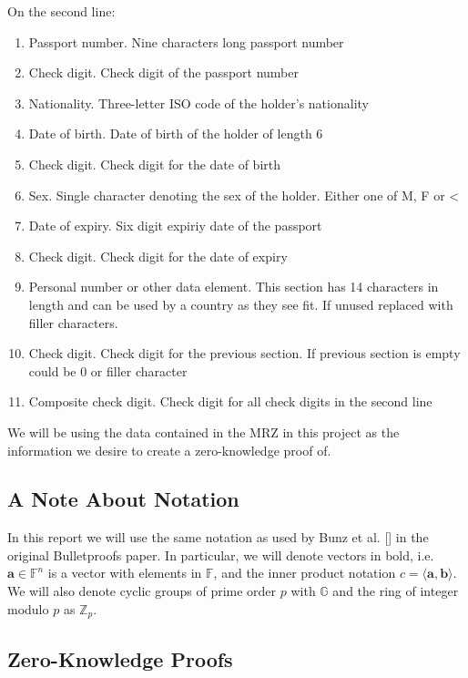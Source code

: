 \documentclass[sigconf,screen,nonacm]{acmart}
\begin{document}
  On the second line:
  \begin{enumerate}
    \item Passport number. Nine characters long passport number
    \item Check digit. Check digit of the passport number
    \item Nationality. Three-letter ISO code of the holder's nationality
    \item Date of birth. Date of birth of the holder of length 6
    \item Check digit. Check digit for the date of birth
    \item Sex. Single character denoting the sex of the holder. Either one of M, F or
      <
    \item Date of expiry. Six digit expiriy date of the passport
    \item Check digit. Check digit for the date of expiry
    \item Personal number or other data element. This section has 14 characters in
      length and can be used by a country as they see fit. If unused replaced with
      filler characters.
    \item Check digit. Check digit for the previous section. If previous section is
      empty could be 0 or filler character
    \item Composite check digit. Check digit for all check digits in the second line
  \end{enumerate}

  We will be using the data contained in the MRZ in this project as the information
  we desire to create a zero-knowledge proof of.

  \subsection{A Note About Notation}

  In this report we will use the same notation as used by Bunz et al.
  [\citeyear{Bunz17}] in the original Bulletproofs paper. In particular, we will 
  denote vectors in bold, i.e. $\mathbf{a} \in \mathbb{F}^n$ is a vector with elements
  in $\mathbb{F}$, and the inner product notation
  $c = \langle \mathbf{a}, \mathbf{b} \rangle$. We will also denote cyclic groups of
  prime order $p$ with $\mathbb{G}$ and the ring of integer modulo $p$ as
  $\mathbb{Z}_p$.

  \subsection{Zero-Knowledge Proofs}
\end{document}
